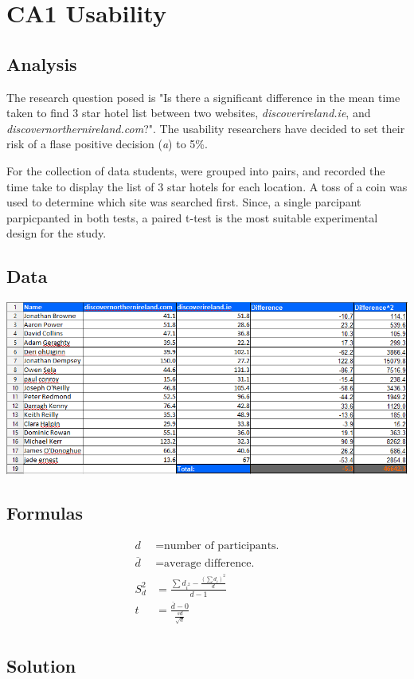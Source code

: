 \documentclass[12pt]{report}
\author{Aaron Power}
\begin{document}
\chapter{CA1 Usability}
\section{Analysis}
The research question posed is "Is there a significant difference in the mean time taken to find 3 star hotel list between two websites, \textit{discoverireland.ie}, and \textit{discovernorthernireland.com}?". The usability researchers have decided to set their risk of a flase positive decision (\textit{a}) to 5\%.

For the collection of data students, were grouped into pairs, and recorded the time take to display the list of 3 star hotels for each location. A toss of a coin was used to determine which site was searched first. Since, a single parcipant parpicpanted in both tests, a paired t-test is the most suitable experimental design for the study.

\section{Data}
\includegraphics{exceltable.png}
\section{Formulas}
\begin{align*}
     d &= \text{number of participants.} \\
     \overline{d} &= \text{average difference.} \\
     S^2_d &= \frac{\sum d_{i^2} - \frac{(\sum d_i)^2}{d}}{d-1} \\
     t &= \frac{\overline{d} - 0}{\frac{sd}{\sqrt{d}}} \\
\end{align*}

\section{Solution}
\end{document}
